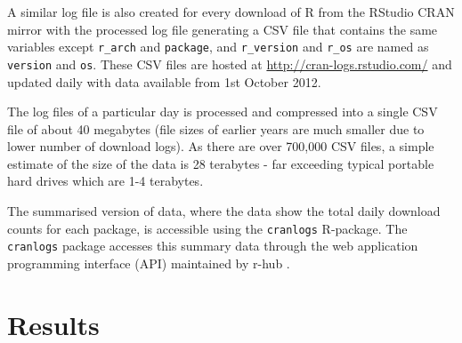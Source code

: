 A similar log file is also created for every download of R from the
RStudio CRAN mirror with the processed log file generating a CSV file
that contains the same variables except \texttt{r\_arch} and
\texttt{package}, and \texttt{r\_version} and \texttt{r\_os} are named
as \texttt{version} and \texttt{os}. These CSV files are hosted at
\url{http://cran-logs.rstudio.com/} and updated daily with data
available from 1st October 2012.

The log files of a particular day is processed and compressed into a
single CSV file of about 40 megabytes (file sizes of earlier years are
much smaller due to lower number of download logs). As there are over
700,000 CSV files, a simple estimate of the size of the data is 28
terabytes - far exceeding typical portable hard drives which are 1-4
terabytes.

The summarised version of data, where the data show the total daily
download counts for each package, is accessible using the
\texttt{cranlogs} R-package. The \texttt{cranlogs} package accesses this
summary data through the web application programming interface (API)
maintained by r-hub \citep{rhub}.

\hypertarget{results}{%
\section{Results}\label{results}}



\address{%
Emi Tanaka\\
Monash University\\%
Monash University\\ Clayton campus, VIC 3800, Australia\\
%
\url{http://emitanaka.org/}\\%
\textit{ORCiD: \href{https://orcid.org/0000-0002-1455-259X}{0000-0002-1455-259X}}\\%
\href{mailto:emi.tanaka@monash.edu}{\nolinkurl{emi.tanaka@monash.edu}}%
}

